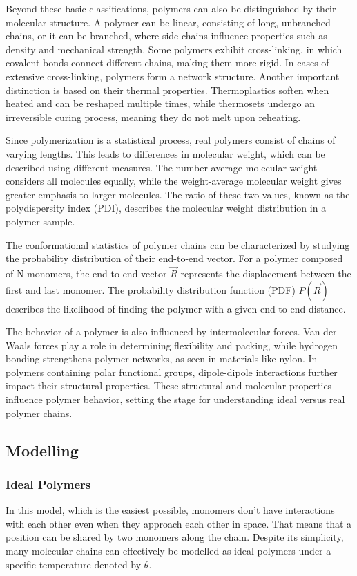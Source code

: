 \documentclass{article}      %
\begin{document}
Beyond these basic classifications, polymers can also be distinguished by their molecular structure. A polymer can be linear, consisting of long, unbranched chains, or it can be branched, where side chains influence properties such as density and mechanical strength. Some polymers exhibit cross-linking, in which covalent bonds connect different chains, making them more rigid. In cases of extensive cross-linking, polymers form a network structure. Another important distinction is based on their thermal properties. Thermoplastics soften when heated and can be reshaped multiple times, while thermosets undergo an irreversible curing process, meaning they do not melt upon reheating.

Since polymerization is a statistical process, real polymers consist of chains of varying lengths. This leads to differences in molecular weight, which can be described using different measures. The number-average molecular weight considers all molecules equally, while the weight-average molecular weight gives greater emphasis to larger molecules. The ratio of these two values, known as the polydispersity index (PDI), describes the molecular weight distribution in a polymer sample.

The conformational statistics of polymer chains can be characterized by studying the probability distribution of their end-to-end vector. For a polymer composed of N monomers, the end-to-end vector $\vec{R}$ represents the displacement between the first and last monomer. The probability distribution function (PDF) $P(\vec{R})$ describes the likelihood of finding the polymer with a given end-to-end distance.

The behavior of a polymer is also influenced by intermolecular forces. Van der Waals forces play a role in determining flexibility and packing, while hydrogen bonding strengthens polymer networks, as seen in materials like nylon. In polymers containing polar functional groups, dipole-dipole interactions further impact their structural properties. These structural and molecular properties influence polymer behavior, setting the stage for understanding ideal versus real polymer chains.


\subsection{Modelling}

\subsubsection{Ideal Polymers}
In this model, which is the easiest possible, monomers don't have interactions with each other even when they approach each other in space. That means that a position can be shared by two monomers along the chain.
Despite its simplicity, many molecular chains can effectively be modelled as ideal polymers under a specific temperature denoted by $\theta$.
\end{document}
